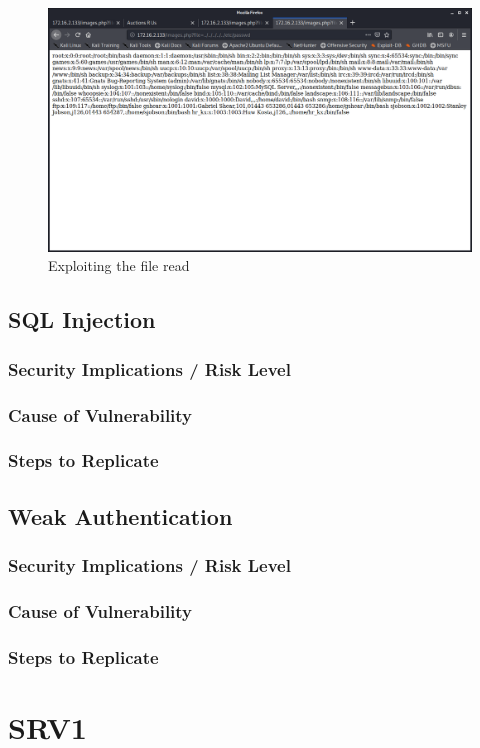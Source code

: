 \documentclass{report}
\begin{document}
\begin{figure}
	\centering
	\includegraphics[scale=0.4]{img/pathtraversal3.png}
	\caption{Exploiting the file read}
\end{figure}
\subsection{SQL Injection}
\subsubsection{Security Implications / Risk Level}
\subsubsection{Cause of Vulnerability}
\subsubsection{Steps to Replicate}
\subsection{Weak Authentication}
\subsubsection{Security Implications / Risk Level}
\subsubsection{Cause of Vulnerability}
\subsubsection{Steps to Replicate}
\section{SRV1}
\end{document}
